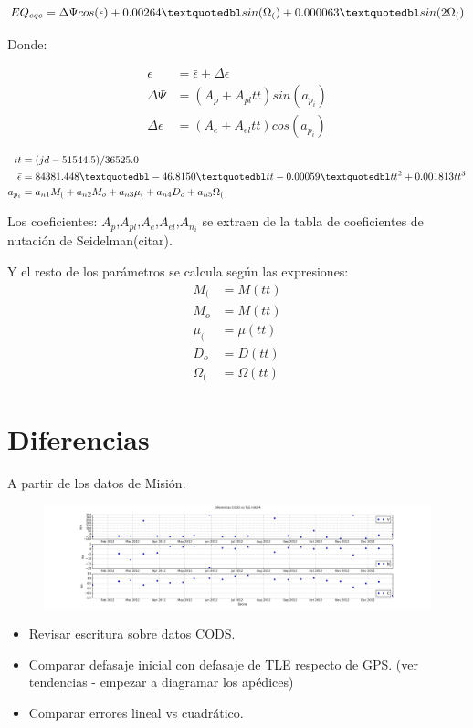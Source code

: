 \begin{equation}
 EQ_{eqe}=\Delta \Psi cos({\epsilon}) + 0.00264 \textquotedbl sin(\Omega_{(}) + 0.000063 \textquotedbl sin (2 \Omega_{(})
\end{equation}

Donde:

\begin{align*}
 \epsilon &= {\bar{\epsilon}} + \Delta \epsilon\\
 \Delta \Psi &= (A_{p} + A_{pl} tt) sin(a_{p_{i}})\\
 \Delta \epsilon &= (A_{e} + A_{el} tt) cos(a_{p_{i}})
\end{align*}

\begin{align*}
 tt &= (jd - 51544.5)/36525.0\\
 {\bar{\epsilon}} &= 84381.448 \textquotedbl - 46.8150 \textquotedbl tt - 0.00059 \textquotedbl tt^{2} + 0.001813 tt^{3}\\
 a_{p_{i}} &= a_{n1}M_{(}+a_{n2}M_{o}+a_{n3}\mu_{(}+a_{n4}D_{o}+a_{n5}\Omega_{(}
\end{align*}

Los coeficientes: $A_{p}$,$A_{pl}$,$A_{e}$,$A_{el}$,$A_{n_{i}}$ se extraen de la tabla de coeficientes de nutaci\'on de Seidelman(citar).

Y el resto de los par\'ametros se calcula seg\'un las expresiones:\\

\begin{align*}
 M_{(} & = M(tt)\\
 M_{o} & = M(tt)\\
 \mu_{(} &= \mu(tt)\\
 D_{o} &= D(tt)\\
 \Omega_{(} &= \Omega(tt)
\end{align*}

\section{Diferencias}
A partir de los datos de Misión. 

\begin{figure}[!h]
  \centering
  \includegraphics[width=\textwidth]{imagenes/sesgoTLE}
\end{figure}

\begin{itemize}
 \item Revisar escritura sobre datos CODS.
 \item Comparar defasaje inicial con defasaje de TLE respecto de GPS. (ver tendencias - empezar a diagramar los apédices)
 \item Comparar errores lineal vs cuadr\'atico.
\end{itemize}
